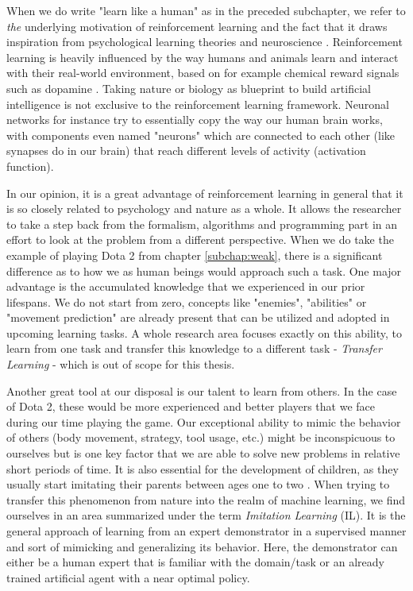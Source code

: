 When we do write "learn like a human" as in the preceded subchapter, we refer to \textit{the} underlying motivation of reinforcement learning and the fact that it draws inspiration from psychological learning theories \cite[p.~341]{Sutton1998} and neuroscience \cite[p.~377]{Sutton1998}. Reinforcement learning is heavily influenced by the way humans and animals learn and interact with their real-world environment, based on for example chemical reward signals such as dopamine \cite[p.~383]{Sutton1998}. Taking nature or biology as blueprint to build artificial intelligence is not exclusive to the reinforcement learning framework. Neuronal networks for instance try to essentially copy the way our human brain works, with components even named "neurons" which are connected to each other (like synapses do in our brain) that reach different levels of activity (activation function).
\par
In our opinion, it is a great advantage of reinforcement learning in general that it is so closely related to psychology and nature as a whole. It allows the researcher to take a step back from the formalism, algorithms and programming part in an effort to look at the problem from a different perspective. When we do take the example of playing Dota 2 from chapter \ref{subchap:weak}, there is a significant difference as to how we as human beings would approach such a task. One major advantage is the accumulated knowledge that we experienced in our prior lifespans. We do not start from zero, concepts like "enemies", "abilities" or "movement prediction" are already present that can be utilized and adopted in upcoming learning tasks. A whole research area focuses exactly on this ability, to learn from one task and transfer this knowledge to a different task - \textit{Transfer Learning} - which is out of scope for this thesis.
\par
Another great tool at our disposal is our talent to learn from others. In the case of Dota 2, these would be more experienced and better players that we face during our time playing the game. Our exceptional ability to mimic the behavior of others (body movement, strategy, tool usage, etc.) might be inconspicuous to ourselves but is one key factor that we are able to solve new problems in relative short periods of time. It is also essential for the development of children, as they usually start imitating their parents between ages one to two \cite[p.347]{wood2013whom}. When trying to transfer this phenomenon from nature into the realm of machine learning, we find ourselves in an area summarized under the term \textit{Imitation Learning} (IL). It is the general approach of learning from an expert demonstrator in a supervised manner and sort of mimicking and generalizing its behavior. Here, the demonstrator can either be a human expert that is familiar with the domain/task or an already trained artificial agent with a near optimal policy.
